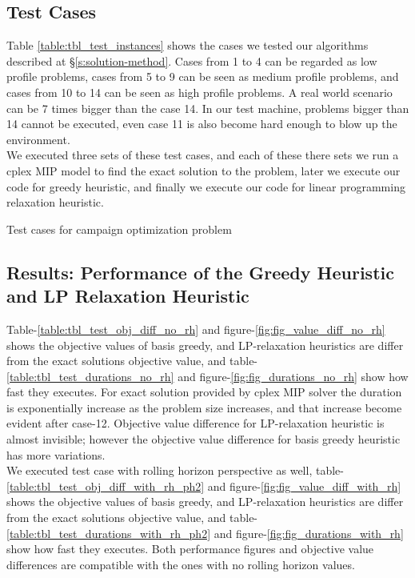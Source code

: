 \documentclass[11pt]{article}
\begin{document}
\subsection{Test Cases} \label{test_cases}
Table \ref{table:tbl_test_instances} shows the cases we tested our algorithms described at \S \ref{s:solution-method}. Cases from 1 to 4 can be regarded as low profile problems, cases from 5 to 9 can be seen as medium profile problems, and cases from 10 to 14 can be seen as high profile problems. A real world scenario can be 7 times bigger than the case 14. In our test machine, problems bigger than 14 cannot be executed, even case 11 is also become hard enough to blow up the environment.\\
We executed three sets of these test cases, and each of these there sets we run a cplex MIP model to find the exact solution to the problem, later we execute our code for greedy heuristic, and finally we execute our code for linear programming relaxation heuristic. 
\begin{table}[htb]
    \centering
    \caption[Short Caption for LoT]{Test cases for campaign optimization problem}\label{table:tbl_test_instances}
\end{table}

\subsection{Results: Performance of the Greedy Heuristic and LP Relaxation Heuristic} \label{test_evaluation}
Table-\ref{table:tbl_test_obj_diff_no_rh} and figure-\ref{fig:fig_value_diff_no_rh} shows the objective values of basis greedy, and LP-relaxation heuristics are differ from the exact solutions objective value, and table-\ref{table:tbl_test_durations_no_rh} and figure-\ref{fig:fig_durations_no_rh} show how fast they executes.
For exact solution provided by cplex MIP solver the duration is exponentially increase as the problem size increases, and that increase become evident after case-12. Objective value difference for LP-relaxation heuristic is almost invisible; however the objective value difference for basis greedy heuristic has more variations.\\

We executed test case with rolling horizon perspective as well, table-\ref{table:tbl_test_obj_diff_with_rh_ph2} and figure-\ref{fig:fig_value_diff_with_rh} shows the objective values of basis greedy, and LP-relaxation heuristics are differ from the exact solutions objective value, and table-\ref{table:tbl_test_durations_with_rh_ph2} and figure-\ref{fig:fig_durations_with_rh} show how fast they executes. Both performance figures and objective value differences are compatible with the ones with no rolling horizon values.\\
\end{document}

